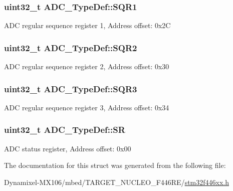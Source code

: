 \subsubsection[{\texorpdfstring{S\+Q\+R1}{SQR1}}]{ uint32\+\_\+t A\+D\+C\+\_\+\+Type\+Def\+::\+S\+Q\+R1}\hypertarget{struct_a_d_c___type_def_a0185aa54962ba987f192154fb7a2d673}{}\label{struct_a_d_c___type_def_a0185aa54962ba987f192154fb7a2d673}
A\+DC regular sequence register 1, Address offset\+: 0x2C 
\subsubsection[{\texorpdfstring{S\+Q\+R2}{SQR2}}]{ uint32\+\_\+t A\+D\+C\+\_\+\+Type\+Def\+::\+S\+Q\+R2}\hypertarget{struct_a_d_c___type_def_a6b6e55e6c667042e5a46a76518b73d5a}{}\label{struct_a_d_c___type_def_a6b6e55e6c667042e5a46a76518b73d5a}
A\+DC regular sequence register 2, Address offset\+: 0x30 
\subsubsection[{\texorpdfstring{S\+Q\+R3}{SQR3}}]{ uint32\+\_\+t A\+D\+C\+\_\+\+Type\+Def\+::\+S\+Q\+R3}\hypertarget{struct_a_d_c___type_def_a51dbdba74c4d3559157392109af68fc6}{}\label{struct_a_d_c___type_def_a51dbdba74c4d3559157392109af68fc6}
A\+DC regular sequence register 3, Address offset\+: 0x34 
\subsubsection[{\texorpdfstring{SR}{SR}}]{ uint32\+\_\+t A\+D\+C\+\_\+\+Type\+Def\+::\+SR}\hypertarget{struct_a_d_c___type_def_a9745df96e98f3cdc2d05ccefce681f64}{}\label{struct_a_d_c___type_def_a9745df96e98f3cdc2d05ccefce681f64}
A\+DC status register, Address offset\+: 0x00 

The documentation for this struct was generated from the following file\+:\begin{DoxyCompactItemize}
\item 
Dynamixel-\/\+M\+X106/mbed/\+T\+A\+R\+G\+E\+T\+\_\+\+N\+U\+C\+L\+E\+O\+\_\+\+F446\+R\+E/\hyperlink{stm32f446xx_8h}{stm32f446xx.\+h}\end{DoxyCompactItemize}
